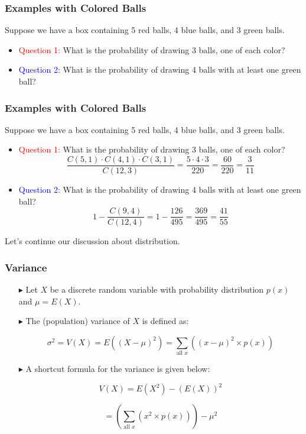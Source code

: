 \documentclass[12pt]{beamer}
\begin{document}
		\begin{frame}
			\frametitle{Examples with Colored Balls}
			
			Suppose we have a box containing 5 red balls, 4 blue balls, and 3 green balls.
			\begin{itemize}
	\item \textcolor{red}{Question 1:} What is the probability of drawing 3 balls, one of each color?
	
	\item \textcolor{blue}{Question 2:} What is the probability of drawing 4 balls with at least one green ball?
\end{itemize}
			\end{frame}
				\begin{frame}
			\frametitle{Examples with Colored Balls}
			
			Suppose we have a box containing 5 red balls, 4 blue balls, and 3 green balls.
			
			\begin{itemize}
				\item \textcolor{red}{Question 1:} What is the probability of drawing 3 balls, one of each color?
				\[\frac{C(5,1) \cdot C(4,1) \cdot C(3,1)}{C(12,3)} = \frac{5 \cdot 4 \cdot 3}{220} = \frac{60}{220} = \frac{3}{11}\]
				
				\item \textcolor{blue}{Question 2:} What is the probability of drawing 4 balls with at least one green ball?
				\[1 - \frac{C(9,4)}{C(12,4)} = 1 - \frac{126}{495} = \frac{369}{495} = \frac{41}{55}\]
			\end{itemize}
			
		\end{frame}
	\begin{frame}
Let's continue our discussion about distribution.
\end{frame}
	\begin{frame}
		\frametitle{Variance}
		
		\begin{itemize}
			\item[\color{blue}$\blacktriangleright$] Let $X$ be a discrete random variable with probability distribution $p(x)$ and $\mu = E(X)$.
			\item[\color{blue}$\blacktriangleright$] The (population) variance of $X$ is defined as:
			
			\[
			\sigma^2 = V(X) = E((X-\mu)^2) = \sum_{\text{all }x} ((x-\mu)^2 \times p(x))
			\]
			
			\item[\color{blue}$\blacktriangleright$] A shortcut formula for the variance is given below:
			
			\[
			V(X) = E(X^2) - (E(X))^2
			\]
			
			\[
			= \left(\sum_{\text{all }x} (x^2 \times p(x))\right) - \mu^2
			\]
			
		\end{itemize}
		
	\end{frame}
\end{document}
